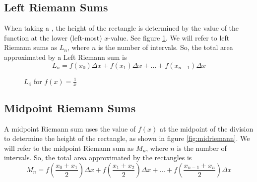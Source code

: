 \subsection{Left Riemann Sums}
When taking a , the height of the rectangle is determined by the value of the function at the lower (left-most) $x$-value. See figure \ref{fig:leftriemann}. We will refer to left Riemann sums as $L_n$, where $n$ is the number of intervals. So, the total area approximated by a Left Riemann sum is $$L_n = f(x_0)\Delta x + f(x_1)\Delta x + \ldots + f(x_{n-1})\Delta x$$

\begin{figure}
	\centering
	\caption{$L_4$ for $f(x)=\frac{1}{x}$}
	\label{fig:leftriemann}
\end{figure}


\subsection{Midpoint Riemann Sums}
A midpoint Riemann sum uses the value of $f(x)$ at the midpoint of the division to determine the height of the rectangle, as shown in figure \ref{fig:midriemann}. We will refer to the midpoint Riemann sum as $M_n$, where $n$ is the number of intervals. So, the total area approximated by the rectangles is $$M_n = f(\frac{x_0+x_1}{2})\Delta x + f(\frac{x_1+x_2}{2})\Delta x + \ldots + f(\frac{x_{n-1}+x_n}{2})\Delta x$$

